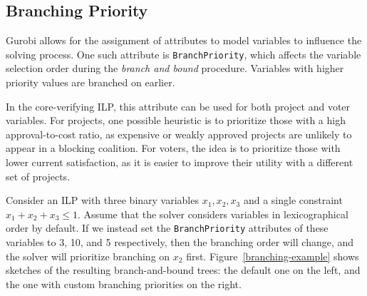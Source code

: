 \documentclass[magisterska,en]{pracamgr}
\begin{document}
\subsection{Branching Priority}

Gurobi allows for the assignment of attributes to model variables to influence the solving process. One such attribute is \texttt{BranchPriority}, which affects the variable selection order during the \textit{branch and bound} procedure. Variables with higher priority values are branched on earlier.

In the core-verifying ILP, this attribute can be used for both project and voter variables. For projects, one possible heuristic is to prioritize those with a high approval-to-cost ratio, as expensive or weakly approved projects are unlikely to appear in a blocking coalition. For voters, the idea is to prioritize those with lower current satisfaction, as it is easier to improve their utility with a different set of projects.

Consider an ILP with three binary variables $x_1,x_2,x_3$ and a single constraint $x_1+x_2+x_3\leq1$. Assume that the solver considers variables in lexicographical order by default. If we instead set the \texttt{BranchPriority} attributes of these variables to 3, 10, and 5 respectively, then the branching order will change, and the solver will prioritize branching on $x_2$ first. Figure~\ref{branching-example} shows sketches of the resulting branch-and-bound trees: the default one on the left, and the one with custom branching priorities on the right.
\end{document}
